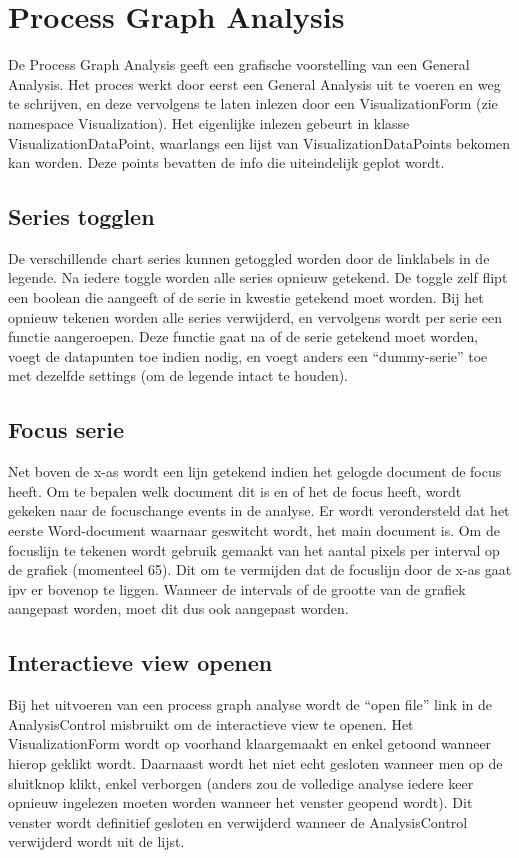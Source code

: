 \documentclass[a4paper,11pt]{report}
\begin{document}
\section{Process Graph Analysis}
De Process Graph Analysis geeft een grafische voorstelling van een General Analysis. Het proces werkt door eerst een General Analysis uit te voeren en weg te schrijven, en deze vervolgens te laten inlezen door een VisualizationForm (zie namespace Visualization). Het eigenlijke inlezen gebeurt in klasse VisualizationDataPoint, waarlangs een lijst van VisualizationDataPoints bekomen kan worden. Deze points bevatten de info die uiteindelijk geplot wordt.
\subsection{Series togglen}
De verschillende chart series kunnen getoggled worden door de linklabels in de legende. Na iedere toggle worden alle series opnieuw getekend. De toggle zelf flipt een boolean die aangeeft of de serie in kwestie getekend moet worden. Bij het opnieuw tekenen worden alle series verwijderd, en vervolgens wordt per serie een functie aangeroepen. Deze functie gaat na of de serie getekend moet worden, voegt de datapunten toe indien nodig, en voegt anders een ``dummy-serie'' toe met dezelfde settings (om de legende intact te houden).
\subsection{Focus serie}
Net boven de x-as wordt een lijn getekend indien het gelogde document de focus heeft. Om te bepalen welk document dit is en of het de focus heeft, wordt gekeken naar de focuschange events in de analyse. Er wordt verondersteld dat het eerste Word-document waarnaar geswitcht wordt, het main document is.
Om de focuslijn te tekenen wordt gebruik gemaakt van het aantal pixels per interval op de grafiek (momenteel 65). Dit om te vermijden dat de focuslijn door de x-as gaat ipv er bovenop te liggen. Wanneer de intervals of de grootte van de grafiek aangepast worden, moet dit dus ook aangepast worden.
\subsection{Interactieve view openen}
Bij het uitvoeren van een process graph analyse wordt de ``open file'' link in de AnalysisControl misbruikt om de interactieve view te openen. Het VisualizationForm wordt op voorhand klaargemaakt en enkel getoond wanneer hierop geklikt wordt. Daarnaast wordt het niet echt gesloten wanneer men op de sluitknop klikt, enkel verborgen (anders zou de volledige analyse iedere keer opnieuw ingelezen moeten worden wanneer het venster geopend wordt). Dit venster wordt definitief gesloten en verwijderd wanneer de AnalysisControl verwijderd wordt uit de lijst.
\end{document}
